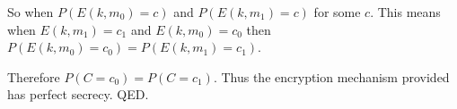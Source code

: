 \documentclass[10pt]{article}
\begin{document}
So when $P(E(k, m_0) = c)$ and $P(E(k, m_1) = c)$ for some $c$. This means when 
$E(k, m_1) = c_1$ and $E(k, m_0) = c_0$ then $P(E(k, m_0) = c_0) = P(E(k, m_1) = c_1)$.

Therefore $P(C = c_0) = P(C = c_1)$.
Thus the encryption mechanism provided has perfect secrecy.
QED.

\end{document}
